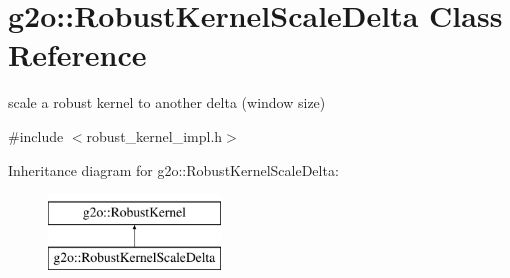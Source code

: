 \hypertarget{classg2o_1_1_robust_kernel_scale_delta}{}\section{g2o\+:\+:Robust\+Kernel\+Scale\+Delta Class Reference}
\label{classg2o_1_1_robust_kernel_scale_delta}


scale a robust kernel to another delta (window size)  




{\ttfamily \#include $<$robust\+\_\+kernel\+\_\+impl.\+h$>$}

Inheritance diagram for g2o\+:\+:Robust\+Kernel\+Scale\+Delta\+:\begin{figure}[H]
\begin{center}
\leavevmode
\includegraphics[height=2.000000cm]{classg2o_1_1_robust_kernel_scale_delta}
\end{center}
\end{figure}
